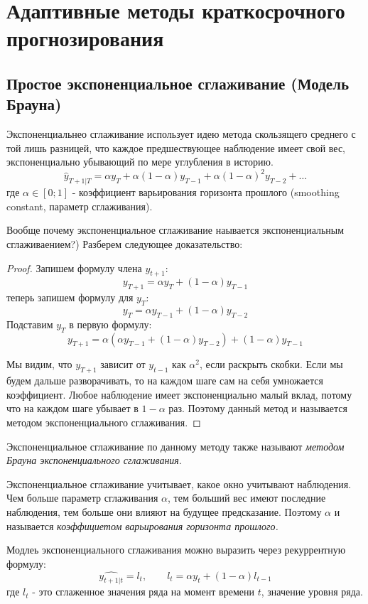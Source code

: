 \documentclass[aps,%
12pt,%
final,%
oneside,
onecolumn,%
musixtex, %
superscriptaddress,%
centertags]{article} %
\theoremstyle{plain}
\theoremstyle{definition}
\theoremstyle{remark}
\begin{document}
\newpage
\section{Адаптивные методы краткосрочного прогнозирования}

\subsection{Простое экспоненциальное сглаживание (Модель Брауна)}

Экспоненциальнео сглаживание использует идею метода скользящего среднего с той лишь разницей, что каждое предшествующее наблюдение имеет свой вес, экспоненциально убывающий по мере углубления в историю.
$$\hat{y}_{T+1|T} = \alpha y_T + \alpha(1-\alpha)y_{T-1} + \alpha(1-\alpha)^2y_{T-2} + \ldots$$
где $\alpha \in [0;1]$ - коэффициент варьирования горизонта прошлого (smoothing constant, параметр сглаживания).

Вообще почему экспоненциальное сглаживание наывается экспоненциальным сглаживаением?) Разберем следующее доказательство:
\begin{proof}
	Запишем формулу члена $y_{t+1}$:
	$$y_{T+1} = \alpha y_T + (1-\alpha)y_{T-1}$$
	теперь запишем формулу для $y_{T}$:
	$$y_{T} = \alpha y_{T-1} + (1-\alpha)y_{T-2}$$
	Подставим $y_T$ в первую формулу:
	$$y_{T+1} =  \alpha(\alpha y_{T-1} + (1-\alpha)y_{T-2}) + (1-\alpha)y_{T-1}$$

	Мы видим, что $y_{T+1}$ зависит от $y_{t-1}$ как $\alpha^2$, если раскрыть скобки. Если мы будем дальше разворачивать, то на каждом шаге сам на себя умножается коэффициент. Любое наблюдение имеет экспоненциально малый вклад, потому что на каждом шаге убывает в $1-\alpha$ раз. Поэтому данный метод и называется методом экспоненциального сглаживания.
\end{proof}

Экспоненциальное сглаживание по данному методу также называют \textit{методом Брауна экспоненциального сглаживания}.

Экспоненциальное сглаживание учитывает, какое окно учитывают наблюдения. Чем больше параметр сглаживания $\alpha$, тем больший вес имеют последние наблюдения, тем больше они влияют на будущее предсказание. Поэтому $\alpha$ и называется \textit{коэффициетом варьирования горизонта прошлого.}

Модлеь экспоненциального сглаживания можно выразить через рекуррентную формулу:
$$\hat{y_{t+1|t}} = l_t, \qquad l_t = \alpha y_t + (1-\alpha)l_{t-1}$$
где $l_t$ - это сглаженное значения ряда на момент времени $t$, значение уровня ряда.
\end{document}
